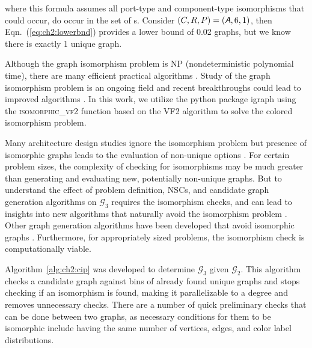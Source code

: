 \noindent where this formula assumes all port-type and component-type isomorphisms that could occur, do occur in the set of \mypm{}s. Consider $(C,R,P) = (\textsl{\textsf{A}},6,1)$, then Eqn.~(\ref{eq:ch2:lowerbnd}) provides a lower bound of 0.02 graphs, but we know there is exactly 1 unique graph.

Although the graph isomorphism problem is NP (nondeterministic polynomial time), there are many efficient practical algorithms \cite{McKay2014a}. Study of the graph isomorphism problem is an ongoing field and recent breakthroughs could lead to improved algorithms \cite{Babai2016a}. In this work, we utilize the python package igraph using the \textsc{isomorphic\_vf2} function \cite{igraph} based on the VF2 algorithm \cite{Cordella2001a} to solve the colored isomorphism problem.

Many architecture design studies ignore the isomorphism problem but presence of isomorphic graphs leads to the evaluation of non-unique options \cite{Schmidt2000a}. For certain problem sizes, the complexity of checking for isomorphisms may be much greater than generating and evaluating new, potentially non-unique graphs. But to understand the effect of problem definition, NSCs, and candidate graph generation algorithms on $\mathcal{G}_3$ requires the isomorphism checks, and can lead to insights into new algorithms that naturally avoid the isomorphism problem \cite{Konigseder2016a}. Other graph generation algorithms have been developed that avoid isomorphic graphs \cite{Read1978a, Faulon2003b}. Furthermore, for appropriately sized problems, the isomorphism check is computationally viable.



Algorithm~\ref{alg:ch2:cip} was developed to determine $\mathcal{G}_3$ given $\mathcal{G}_2$. This algorithm checks a candidate graph against bins of already found unique graphs and stops checking if an isomorphism is found, making it parallelizable to a degree and removes unnecessary checks. There are a number of quick preliminary checks that can be done between two graphs, as necessary conditions for them to be isomorphic include having the same number of vertices, edges, and color label distributions.